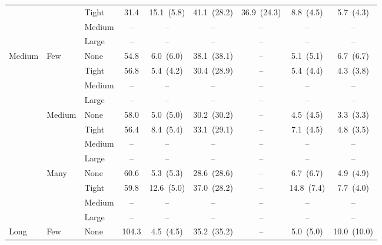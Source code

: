 \documentclass[preprint,12pt,3p]{elsarticle}
\newcommand{\blue}[1]{{\color{darkblue}#1}}
\begin{document}
\begin{table}[htbp]
{\begin{tabular}{lll c ccccc}
 &  & {\small Tight} & 31.4 & 15.1~{\scriptsize(5.8)} & 41.1~{\scriptsize(28.2)} & 36.9~{\scriptsize(24.3)} & 8.8~{\scriptsize(4.5)} & 5.7~{\scriptsize(4.3)} \\
 &  & {\small Medium} & \blue{--} & \blue{--} & \blue{--} & \blue{--} & \blue{--} & \blue{--} \\
 &  & {\small Large} & \blue{--} & \blue{--} & \blue{--} & \blue{--} & \blue{--} & \blue{--} \\
\midrule
\multirow{12}{*}{\small Medium} & \multirow{4}{*}{\small Few} & {\small None} & 54.8 & 6.0~{\scriptsize(6.0)} & 38.1~{\scriptsize(38.1)} & -- & 5.1~{\scriptsize(5.1)} & 6.7~{\scriptsize(6.7)} \\
 &  & {\small Tight} & 56.8 & 5.4~{\scriptsize(4.2)} & 30.4~{\scriptsize(28.9)} & -- & 5.4~{\scriptsize(4.4)} & 4.3~{\scriptsize(3.8)} \\
 &  & {\small Medium} & \blue{--} & \blue{--} & \blue{--} & -- & \blue{--} & \blue{--} \\
 &  & {\small Large} & \blue{--} & \blue{--} & \blue{--} & -- & \blue{--} & \blue{--} \\
 & \multirow{4}{*}{\small Medium} & {\small None} & 58.0 & 5.0~{\scriptsize(5.0)} & 30.2~{\scriptsize(30.2)} & -- & 4.5~{\scriptsize(4.5)} & 3.3~{\scriptsize(3.3)} \\
 &  & {\small Tight} & 56.4 & 8.4~{\scriptsize(5.4)} & 33.1~{\scriptsize(29.1)} & -- & 7.1~{\scriptsize(4.5)} & 4.8~{\scriptsize(3.5)} \\
 &  & {\small Medium} & \blue{--} & \blue{--} & \blue{--} & -- & \blue{--} & \blue{--} \\
 &  & {\small Large} & \blue{--} & \blue{--} & \blue{--} & -- & \blue{--} & \blue{--} \\
 & \multirow{4}{*}{\small Many} & {\small None} & 60.6 & 5.3~{\scriptsize(5.3)} & 28.6~{\scriptsize(28.6)} & -- & 6.7~{\scriptsize(6.7)} & 4.9~{\scriptsize(4.9)} \\
 &  & {\small Tight} & 59.8 & 12.6~{\scriptsize(5.0)} & 37.0~{\scriptsize(28.2)} & -- & 14.8~{\scriptsize(7.4)} & 7.7~{\scriptsize(4.0)} \\
 &  & {\small Medium} & \blue{--} & \blue{--} & \blue{--} & -- & \blue{--} & \blue{--} \\
 &  & {\small Large} & \blue{--} & \blue{--} & \blue{--} & -- & \blue{--} & \blue{--} \\
\midrule
\multirow{12}{*}{\small Long} & \multirow{4}{*}{\small Few} & {\small None} & 104.3 & 4.5~{\scriptsize(4.5)} & 35.2~{\scriptsize(35.2)} & -- & 5.0~{\scriptsize(5.0)} & 10.0~{\scriptsize(10.0)} \\

\end{tabular}}
\end{table}
\end{document}
